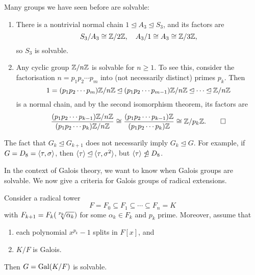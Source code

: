 \begin{example}
\label{exmp_solvable_groups}
    Many groups we have seen before are solvable:
    \begin{enumerate}
        \item 
        There is a nontrivial normal chain $1 \unlhd A_3 \unlhd S_3$, and its factors are
        \[
            S_3/A_3 \cong \mathbb{{Z}}/{{2}}\mathbb{{Z}}, \quad A_3/1 \cong A_3 \cong \mathbb{{Z}}/{{3}}\mathbb{{Z}},
        \]
        so $S_3$ is solvable.
        
        \item Any cyclic group $\mathbb{{Z}}/{{n}}\mathbb{{Z}}$ is solvable for $n \geq 1$. To see this, consider the factorisation $n = p_1 p_2 \cdots p_m$ into (not necessarily distinct) primes $p_k$. Then
        \[
            1 = (p_1 p_2 \cdots p_m) \mathbb{{Z}}/{{n}}\mathbb{{Z}} \unlhd (p_1 p_2 \cdots p_{m - 1}) \mathbb{{Z}}/{{n}}\mathbb{{Z}} \unlhd \cdots \unlhd \mathbb{{Z}}/{{n}}\mathbb{{Z}}
        \]
        is a normal chain, and by the second isomorphism theorem, its factors are
        \[
            \frac{(p_1 p_2 \cdots p_{k - 1}) \mathbb{{Z}}/{{n}}\mathbb{{Z}}}{(p_1 p_2 \cdots p_k) \mathbb{{Z}}/{{n}}\mathbb{{Z}}} \cong \frac{(p_1 p_2 \cdots p_{k - 1}) \mathbb{{Z}}}{(p_1 p_2 \cdots p_k) \mathbb{{Z}}} \cong \mathbb{{Z}}/{{p_k}}\mathbb{{Z}}. \qedhere
        \]
    \end{enumerate}
\end{example}

\begin{remark}
    The fact that $G_k \unlhd G_{k + 1}$ does not necessarily imply $G_k \unlhd G$. For example, if $G = D_8 = \langle {\tau, \sigma} \rangle$, then $\langle {\tau} \rangle \unlhd \langle {\tau, \sigma^2} \rangle$, but $\langle {\tau} \rangle \ntrianglelefteq D_8$.
\end{remark}

In the context of Galois theory, we want to know when Galois groups are solvable. We now give a criteria for Galois groups of radical extensions.

\begin{theorem}
\label{thm_gal_grp_solvable_strong_assns}
    Consider a radical tower
    \[
        F = F_0 \subseteq F_1 \subseteq \cdots \subseteq F_n = K
    \]
    with $F_{k + 1} = F_k(\sqrt[\uproot{3} p_k]{\alpha_k})$ for some $\alpha_k \in F_k$ and $p_k$ prime. Moreover, assume that
    \begin{enumerate}
        \item each polynomial $x^{p_k} - 1$ splits in $F[x]$, and
        \item $K/F$ is Galois.
    \end{enumerate}
    Then $G = \operatorname{Gal}(K/F)$ is solvable.
\end{theorem}

